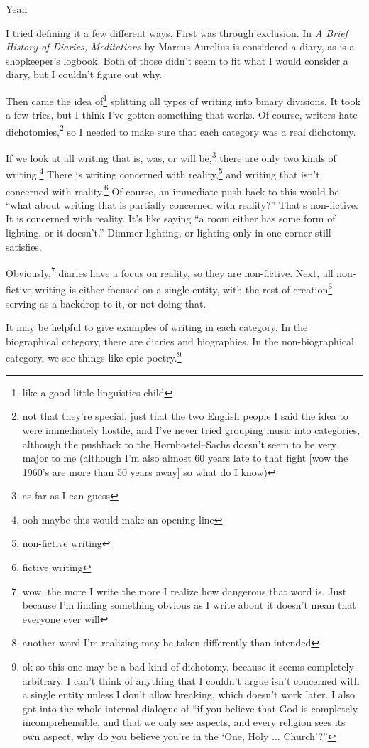 Yeah \documentclass[12pt]{article}[titlepage]
\newcommand{\say}[1]{``#1''}
\newcommand{\nsay}[1]{`#1'}
\newcommand{\1}{\={a}}
\newcommand{\2}{\={e}}
\newcommand{\3}{\={\i}}
\newcommand{\4}{\=o}
\newcommand{\5}{\=u}
\newcommand{\6}{\={A}}
\renewcommand{\,}{\textsuperscript{,}}
\begin{document}
I tried defining it a few different ways.
First was through exclusion.
In \textit{A Brief History of Diaries,} \textit{Meditations} by Marcus Aurelius is considered a diary, as is a shopkeeper's logbook.
Both of those didn't seem to fit what I would consider a diary, but I couldn't figure out why.

Then came the idea of\footnote{like a good little linguistics child} splitting all types of writing into binary divisions.
It took a few tries, but I think I've gotten something that works.
Of course, writers hate dichotomies,\footnote{not that they're special, just that the two English people I said the idea to were immediately hostile, and I've never tried grouping music into categories, although the pushback to the Hornbostel--Sachs doesn't seem to be very major to me (although I'm also almost 60 years late to that fight [wow the 1960's are more than 50 years away] so what do I know)} so I needed to make sure that each category was a real dichotomy.

If we look at all writing that is, was, or will be,\footnote{as far as I can guess} there are only two kinds of writing.\footnote{ooh maybe this would make an opening line}
There is writing concerned with reality,\footnote{non-fictive writing} and writing that isn't concerned with reality.\footnote{fictive writing}
Of course, an immediate push back to this would be \say{what about writing that is partially concerned with reality?}
That's non-fictive.
It is concerned with reality.
It's like saying \say{a room either has some form of lighting, or it doesn't.}
Dimmer lighting, or lighting only in one corner still satisfies.

Obviously,\footnote{wow, the more I write the more I realize how dangerous that word is. Just because I'm finding something obvious as I write about it doesn't mean that everyone ever will} diaries have a focus on reality, so they are non-fictive.
Next, all non-fictive writing is either focused on a single entity, with the rest of creation\footnote{another word I'm realizing may be taken differently than intended} serving as a backdrop to it, or not doing that.

It may be helpful to give examples of writing in each category.
In the biographical category, there are diaries and biographies.
In the non-biographical category, we see things like epic poetry.\footnote{ok so this one may be a bad kind of dichotomy, because it seems completely arbitrary. I can't think of anything that I couldn't argue isn't concerned with a single entity unless I don't allow breaking, which doesn't work later. I also got into the whole internal dialogue of \say{if you believe that God is completely incomprehensible, and that we only see aspects, and every religion sees its own aspect, why do you believe you're in the \nsay{One, Holy ... Church}?}}
\end{document}
